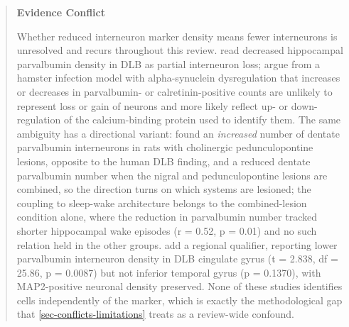 \documentclass[11pt]{article}
\begin{document}
\begin{quote}
\noindent\textbf{Evidence Conflict}\par
Whether reduced interneuron marker density means fewer interneurons is unresolved and recurs throughout this review. \citet{Bernstein2011} read decreased hippocampal parvalbumin density in DLB as partial interneuron loss; \citet{Schreiber2024} argue from a hamster infection model with alpha-synuclein dysregulation that increases or decreases in parvalbumin- or calretinin-positive counts are unlikely to represent loss or gain of neurons and more likely reflect up- or down-regulation of the calcium-binding protein used to identify them. The same ambiguity has a directional variant: \citet{Radovanovic2021} found an \emph{increased} number of dentate parvalbumin interneurons in rats with cholinergic pedunculopontine lesions, opposite to the human DLB finding, and a reduced dentate parvalbumin number when the nigral and pedunculopontine lesions are combined, so the direction turns on which systems are lesioned; the coupling to sleep-wake architecture belongs to the combined-lesion condition alone, where the reduction in parvalbumin number tracked shorter hippocampal wake episodes (r = 0.52, p = 0.01) and no such relation held in the other groups. \citet{Hawksworth2026} add a regional qualifier, reporting lower parvalbumin interneuron density in DLB cingulate gyrus (t = 2.838, df = 25.86, p = 0.0087) but not inferior temporal gyrus (p = 0.1370), with MAP2-positive neuronal density preserved. None of these studies identifies cells independently of the marker, which is exactly the methodological gap that \ref{sec-conflicts-limitations} treats as a review-wide confound.

\end{quote}
\end{document}
